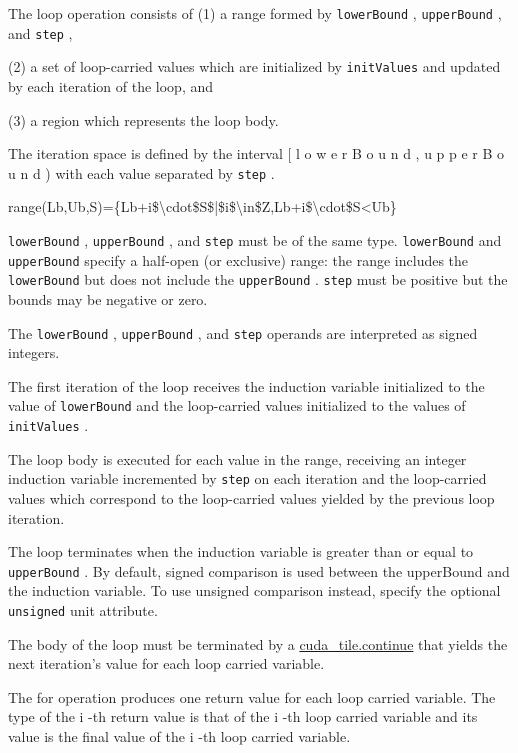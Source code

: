 \documentclass{article}
\begin{document}
The loop operation consists of (1) a range formed by \texttt{lowerBound} , \texttt{upperBound} , and \texttt{step} ,

(2) a set of loop-carried values which are initialized by \texttt{initValues} and updated by each iteration of the loop, and

(3) a region which represents the loop body.


The iteration space is defined by the interval [ l o w e r B o u n d , u p p e r B o u n d ) with each value separated by \texttt{step} .


range(Lb,Ub,S)=\{Lb+i\$\textbackslash{}cdot\$S\$|\$i\$\textbackslash{}in\$Z,Lb+i\$\textbackslash{}cdot\$S<Ub\}

\texttt{lowerBound} , \texttt{upperBound} , and \texttt{step} must be of the same type. \texttt{lowerBound} and \texttt{upperBound} specify a half-open (or exclusive) range: the range includes the \texttt{lowerBound} but does not include the \texttt{upperBound} . \texttt{step} must be positive but the bounds may be negative or zero.


The \texttt{lowerBound} , \texttt{upperBound} , and \texttt{step} operands are interpreted as signed integers.


The first iteration of the loop receives the induction variable initialized to the value of \texttt{lowerBound} and the loop-carried values initialized to the values of \texttt{initValues} .


The loop body is executed for each value in the range, receiving an integer induction variable incremented by \texttt{step} on each iteration and the loop-carried values which correspond to the loop-carried values yielded by the previous loop iteration.


The loop terminates when the induction variable is greater than or equal to \texttt{upperBound} . By default, signed comparison is used between the upperBound and the induction variable. To use unsigned comparison instead, specify the optional \texttt{unsigned} unit attribute.


The body of the loop must be terminated by a \href{https://docs.nvidia.com/cuda/tile-ir/latest/sections/operations.html#op-cuda-tile-continue}{cuda\_tile.continue} that yields the next iteration's value for each loop carried variable.


The for operation produces one return value for each loop carried variable. The type of the i -th return value is that of the i -th loop carried variable and its value is the final value of the i -th loop carried variable.
\end{document}
